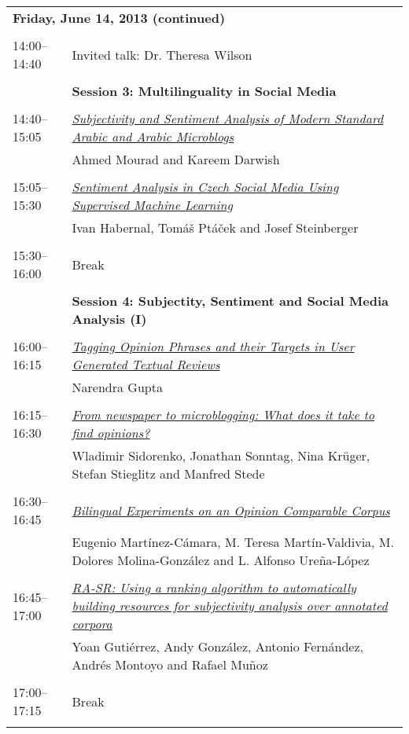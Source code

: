 \begin{tabular}{p{20mm}p{138mm}}
\\
\multicolumn{2}{l}{\bf Friday, June 14, 2013
 (continued)} \\\\
14:00--14:40 & Invited talk: Dr. Theresa Wilson
 \\
\\
 & {\bf Session 3: Multilinguality in Social Media
} \\
\\
14:40--15:05 & \hyperlink{page.55}{\em Subjectivity and Sentiment Analysis of Modern Standard Arabic and Arabic Microblogs}\\
         & Ahmed Mourad and Kareem Darwish \\
\\

15:05--15:30 & \hyperlink{page.65}{\em Sentiment Analysis in Czech Social Media Using Supervised Machine Learning}\\
         & Ivan Habernal, Tom\'{a}\v{s} Pt\'{a}\v{c}ek and Josef Steinberger \\
\\

15:30--16:00 & Break
 \\
\\
 & {\bf Session 4: Subjectity, Sentiment and Social Media Analysis (I)
} \\
\\
16:00--16:15 & \hyperlink{page.75}{\em Tagging Opinion Phrases and their Targets in User Generated Textual Reviews}\\
         & Narendra Gupta \\
\\

16:15--16:30 & \hyperlink{page.81}{\em From newspaper to microblogging: What does it take to find opinions?}\\
         & Wladimir Sidorenko, Jonathan Sonntag, Nina Kr\"{u}ger, Stefan Stieglitz and Manfred Stede \\
\\

16:30--16:45 & \hyperlink{page.87}{\em Bilingual Experiments on an Opinion Comparable Corpus}\\
         & Eugenio Mart\'{i}nez-C\'{a}mara, M. Teresa Mart\'{i}n-Valdivia, M. Dolores Molina-Gonz\'{a}lez and L. Alfonso Ure\~{n}a-L\'{o}pez \\
\\

16:45--17:00 & \hyperlink{page.94}{\em RA-SR: Using a ranking algorithm to automatically building resources for subjectivity analysis over annotated corpora}\\
         & Yoan Guti\'{e}rrez, Andy Gonz\'{a}lez, Antonio Fern\'{a}ndez, Andr\'{e}s Montoyo and Rafael Mu\~{n}oz \\
\\

17:00--17:15 & Break
 \\
\\
\end{tabular}
